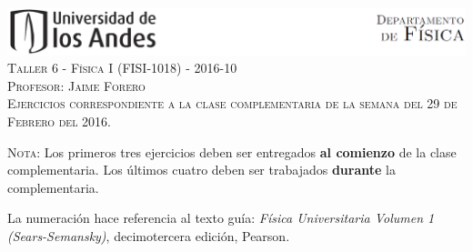 \documentclass[letterpaper,10pt,onecolumn]{article}
\begin{document}
\begin{center}


\includegraphics[width=490pt]{header.png}\\[0.5cm]

\textsc{\LARGE Taller 6 - F\'isica I (FISI-1018) - 2016-10}\\[0.5cm]

\textsc{\Large{Profesor: Jaime Forero}} \\[0.5cm]

\noindent\textsc{Ejercicios correspondiente a la clase complementaria de la semana del 29 de Febrero del 2016.}\\[0.5cm]
\end{center}

\noindent\textsc{Nota:} 
Los primeros tres ejercicios deben ser
entregados {\bf al comienzo} de la clase complementaria. Los \'ultimos
cuatro deben ser trabajados {\bf durante} la complementaria. 

La numeraci\'on
hace referencia al texto gu\'ia: \textit{F\'isica Universitaria Volumen
  1 (Sears-Semansky)}, decimotercera edici\'on, Pearson.
\end{document}

